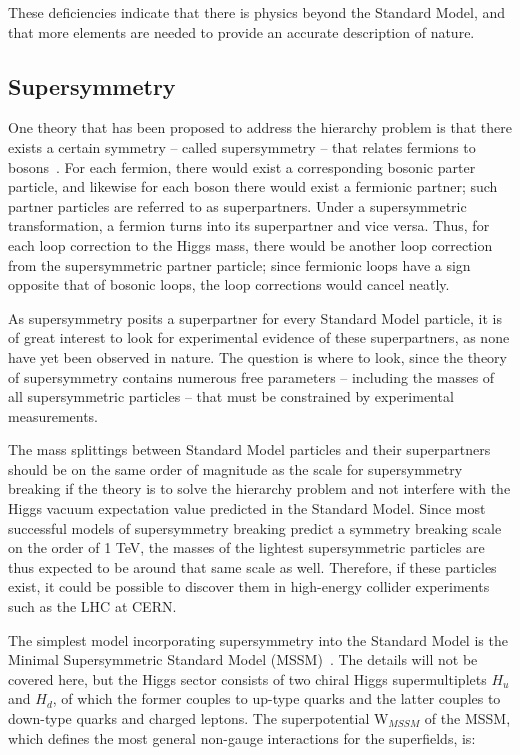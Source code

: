These deficiencies indicate that there is physics beyond the Standard Model, and that more elements are needed to provide an accurate description of nature.

\subsection{Supersymmetry}

One theory that has been proposed to address the hierarchy problem is that there exists a certain symmetry -- called supersymmetry -- that relates fermions to bosons~\cite{Martin:1997ns}. For each fermion, there would exist a corresponding bosonic parter particle, and likewise for each boson there would exist a fermionic partner; such partner particles are referred to as superpartners. Under a supersymmetric transformation, a fermion turns into its superpartner and vice versa. Thus, for each loop correction to the Higgs mass, there would be another loop correction from the supersymmetric partner particle; since fermionic loops have a sign opposite that of bosonic loops, the loop corrections would cancel neatly.

As supersymmetry posits a superpartner for every Standard Model particle, it is of great interest to look for experimental evidence of these superpartners, as none have yet been observed in nature. The question is where to look, since the theory of supersymmetry contains numerous free parameters -- including the masses of all supersymmetric particles -- that must be constrained by experimental measurements.

The mass splittings between Standard Model particles and their superpartners should be on the same order of magnitude as the scale for supersymmetry breaking if the theory is to solve the hierarchy problem and not interfere with the Higgs vacuum expectation value predicted in the Standard Model. Since most successful models of supersymmetry breaking predict a symmetry breaking scale on the order of 1 TeV, the masses of the lightest supersymmetric particles are thus expected to be around that same scale as well. Therefore, if these particles exist, it could be possible to discover them in high-energy collider experiments such as the LHC at CERN.

The simplest model incorporating supersymmetry into the Standard Model is the Minimal Supersymmetric Standard Model (MSSM)~\cite{Martin:1997ns}. The details will not be covered here, but the Higgs sector consists of two chiral Higgs supermultiplets $H_u$ and $H_d$, of which the former couples to up-type quarks and the latter couples to down-type quarks and charged leptons. The superpotential W$_{MSSM}$ of the MSSM, which defines the most general non-gauge interactions for the superfields, is:

